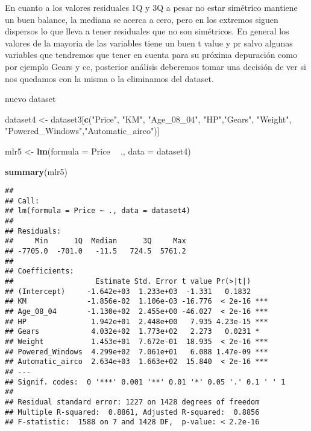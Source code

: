 \documentclass[
]{article}
\newenvironment{Shaded}{\begin{snugshade}}{\end{snugshade}}
\newcommand{\DataTypeTok}[1]{\textcolor[rgb]{0.13,0.29,0.53}{#1}}
\newcommand{\KeywordTok}[1]{\textcolor[rgb]{0.13,0.29,0.53}{\textbf{#1}}}
\newcommand{\NormalTok}[1]{#1}
\newcommand{\OperatorTok}[1]{\textcolor[rgb]{0.81,0.36,0.00}{\textbf{#1}}}
\newcommand{\StringTok}[1]{\textcolor[rgb]{0.31,0.60,0.02}{#1}}
\begin{document}
En cuanto a los valores residuales 1Q y 3Q a pesar no estar simétrico
mantiene un buen balance, la mediana se acerca a cero, pero en los
extremos siguen dispersos lo que lleva a tener residuales que no son
simétricos. En general los valores de la mayoria de las variables tiene
un buen t value y pr salvo algunas variables que tendremos que tener en
cuenta para su próxima depuración como por ejemplo Gears y cc, posterior
análisis deberemos tomar una decisión de ver si nos quedamos con la
misma o la eliminamos del dataset.

nuevo dataset

\begin{Shaded}
\begin{Highlighting}[]
\NormalTok{dataset4 <-}\StringTok{ }\NormalTok{dataset3[}\KeywordTok{c}\NormalTok{(}\StringTok{"Price"}\NormalTok{, }\StringTok{"KM"}\NormalTok{, }\StringTok{"Age_08_04"}\NormalTok{, }\StringTok{"HP"}\NormalTok{,}\StringTok{"Gears"}\NormalTok{, }\StringTok{"Weight"}\NormalTok{,}
                       \StringTok{"Powered_Windows"}\NormalTok{,}\StringTok{"Automatic_airco"}\NormalTok{)]}
\end{Highlighting}
\end{Shaded}

\begin{Shaded}
\begin{Highlighting}[]
\NormalTok{mlr5 <-}\StringTok{ }\KeywordTok{lm}\NormalTok{(}\DataTypeTok{formula =}\NormalTok{ Price }\OperatorTok{~}\StringTok{ }\NormalTok{., }\DataTypeTok{data =}\NormalTok{ dataset4)}

\KeywordTok{summary}\NormalTok{(mlr5)}
\end{Highlighting}
\end{Shaded}

\begin{verbatim}
## 
## Call:
## lm(formula = Price ~ ., data = dataset4)
## 
## Residuals:
##     Min      1Q  Median      3Q     Max 
## -7705.0  -701.0   -11.5   724.5  5761.2 
## 
## Coefficients:
##                   Estimate Std. Error t value Pr(>|t|)    
## (Intercept)     -1.642e+03  1.233e+03  -1.331   0.1832    
## KM              -1.856e-02  1.106e-03 -16.776  < 2e-16 ***
## Age_08_04       -1.130e+02  2.455e+00 -46.027  < 2e-16 ***
## HP               1.942e+01  2.448e+00   7.935 4.23e-15 ***
## Gears            4.032e+02  1.773e+02   2.273   0.0231 *  
## Weight           1.453e+01  7.672e-01  18.935  < 2e-16 ***
## Powered_Windows  4.299e+02  7.061e+01   6.088 1.47e-09 ***
## Automatic_airco  2.634e+03  1.663e+02  15.840  < 2e-16 ***
## ---
## Signif. codes:  0 '***' 0.001 '**' 0.01 '*' 0.05 '.' 0.1 ' ' 1
## 
## Residual standard error: 1227 on 1428 degrees of freedom
## Multiple R-squared:  0.8861, Adjusted R-squared:  0.8856 
## F-statistic:  1588 on 7 and 1428 DF,  p-value: < 2.2e-16
\end{verbatim}
\end{document}
